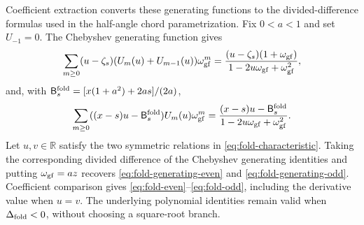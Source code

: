 \documentclass[preprints,article,accept,oneauthor]{Definitions/mdpi}
\numberwithin{equation}{section}
\theoremstyle{mdpi}
\theoremstyle{definition}
\begin{document}
Coefficient extraction converts these generating functions to the
divided-difference formulas used in the half-angle chord parametrization.
Fix \(0<a<1\) and set \(U_{-1}=0\).  The Chebyshev generating function gives
\[
 \sum_{m\geq0}(u-\zeta_s)(U_m(u)+U_{m-1}(u))\omega_{\rm gf}^m
 =\frac{(u-\zeta_s)(1+\omega_{\rm gf})}
 {1-2u\omega_{\rm gf}+\omega_{\rm gf}^2},
\]
and, with \(\mathsf B_s^{\rm fold}=[x(1+a^2)+2as]/(2a)\),
\[
 \sum_{m\geq0}((x-s)u-\mathsf B_s^{\rm fold})U_m(u)\omega_{\rm gf}^m
 =\frac{(x-s)u-\mathsf B_s^{\rm fold}}
 {1-2u\omega_{\rm gf}+\omega_{\rm gf}^2}.
\]
Let \(u,v\in\mathbb R\) satisfy the two symmetric relations in
\eqref{eq:fold-characteristic}.  Taking the corresponding divided
difference of the Chebyshev generating identities and putting
\(\omega_{\rm gf}=az\) recovers
\eqref{eq:fold-generating-even} and \eqref{eq:fold-generating-odd}.
Coefficient comparison gives \eqref{eq:fold-even}--\eqref{eq:fold-odd},
including the derivative value when \(u=v\).  The underlying polynomial
identities remain valid when \(\Delta_{\rm fold}<0\), without choosing a
square-root branch.
\end{document}
